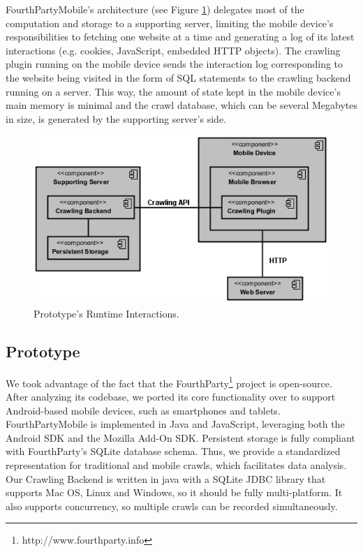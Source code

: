 \documentclass{acm_proc_article-sp}
\begin{document}
FourthPartyMobile's architecture (see Figure \ref{fig:component_diagram}) delegates most of the computation and storage to a supporting server, limiting the mobile device's responsibilities to fetching one website at a time and generating a log of its latest interactions (e.g. cookies, JavaScript, embedded HTTP objects). The crawling plugin running on the mobile device sends the interaction log corresponding to the website being visited in the form of SQL statements to the crawling backend running on a server. This way, the amount of state kept in the mobile device's main memory is minimal and the crawl database, which can be several Megabytes in size, is generated by the supporting server's side. 

\begin{figure}[h] 
\centering \includegraphics[scale=0.65]{diagrams/component_diagram.png}
\caption{Prototype's Runtime Interactions.}
\label{fig:component_diagram}
\end{figure}

\subsection{Prototype}
We took advantage of the fact that the FourthParty\footnote{http://www.fourthparty.info} project is open-source. After analyzing its codebase, we ported its core functionality over to support Android-based mobile devices, such as smartphones and tablets. FourthPartyMobile is implemented in Java and JavaScript, leveraging both the Android SDK and the Mozilla Add-On SDK. Persistent storage is fully compliant with FourthParty's SQLite database schema. Thus, we provide a standardized representation for traditional and mobile crawls, which facilitates data analysis. Our Crawling Backend is written in java with a SQLite JDBC library that supports Mac OS, Linux and Windows, so it should be fully multi-platform. It also supports concurrency, so multiple crawls can be recorded simultaneously. 
\end{document}
